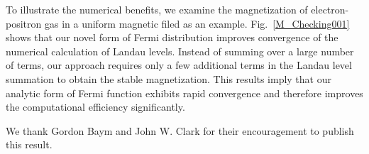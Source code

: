 \documentclass[sn-mathphys,Numbered]{sn-jnl}
\begin{document}
To illustrate the numerical benefits, we examine the magnetization of electron-positron gas in a uniform magnetic filed as an example. Fig.~\ref{M_Checking001} shows that our novel form of Fermi distribution improves convergence of the numerical calculation of Landau levels. Instead of summing over a large number of terms, our approach  requires only a few additional terms in the Landau level summation to obtain the stable magnetization. This results imply that our analytic form of Fermi function exhibits rapid convergence and therefore improves the computational efficiency significantly.






\backmatter

We thank Gordon Baym and John W. Clark for their encouragement to publish this result.


\end{document}

